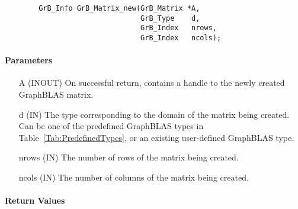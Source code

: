 \begin{verbatim}
        GrB_Info GrB_Matrix_new(GrB_Matrix *A,
                                GrB_Type    d,
                                GrB_Index   nrows,
                                GrB_Index   ncols);
\end{verbatim}

\paragraph{Parameters}

\begin{itemize}[leftmargin=1.1in]
    \item[{\sf A}] ({\sf INOUT}) On successful return, contains a handle to 
                                 the newly created GraphBLAS matrix.
    \item[{\sf d}] ({\sf IN})    The type corresponding to the domain of the matrix 
                                 being created. Can be one of the predefined
                                 GraphBLAS types in Table~\ref{Tab:PredefinedTypes}, 
                                 or an existing user-defined GraphBLAS type.
    \item[{\sf nrows}] ({\sf IN}) The number of rows of the matrix being created.
    \item[{\sf ncols}] ({\sf IN}) The number of columns of the matrix being created.
\end{itemize}


\paragraph{Return Values}

